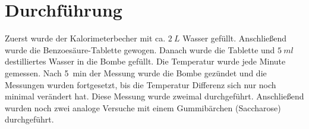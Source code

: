 \section{Durchführung}
Zuerst wurde der Kalorimeterbecher mit ca. $2\ L$ Wasser gefüllt. 
Anschließend wurde die Benzoesäure-Tablette gewogen. 
Danach wurde die Tablette und $5\ ml$ destilliertes Wasser in die Bombe gefüllt. 
Die Temperatur wurde jede Minute gemessen. 
Nach \qty{5}{\minute} der Messung wurde die Bombe gezündet und die Messungen wurden fortgesetzt, bis die Temperatur Differenz sich nur noch minimal verändert hat. 
Diese Messung wurde zweimal durchgeführt. 
Anschließend wurden noch zwei analoge Versuche mit einem Gummibärchen (Saccharose) durchgeführt.
